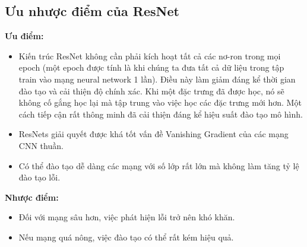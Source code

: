 \subsection{Ưu nhược điểm của ResNet}
\textbf{Ưu điểm:}
\begin{itemize}
	\item Kiến trúc ResNet không cần phải kích hoạt tất cả các nơ-ron trong mọi epoch (một epoch được tính là khi chúng ta đưa tất cả dữ liệu trong tập train vào mạng neural network 1 lần). Điều này làm giảm đáng kể thời gian đào tạo và cải thiện độ chính xác. Khi một đặc trưng đã được học, nó sẽ không cố gắng học lại mà tập trung vào việc học các đặc trưng mới hơn. Một cách tiếp cận rất thông minh đã cải thiện đáng kể hiệu suất đào tạo mô hình.
	\item ResNets giải quyết được khá tốt vấn đề Vanishing Gradient của các mạng CNN thuần.
	\item Có thể đào tạo dễ dàng các mạng với số lớp rất lớn mà không làm tăng tỷ lệ đào tạo lỗi.
\end{itemize}
\textbf{Nhược điểm: \cite{resnet_disadvantage}}
\begin{itemize}
	\item Đối với mạng sâu hơn, việc phát hiện lỗi trở nên khó khăn.
	\item Nếu mạng quá nông, việc đào tạo có thể rất kém hiệu quả.
\end{itemize}